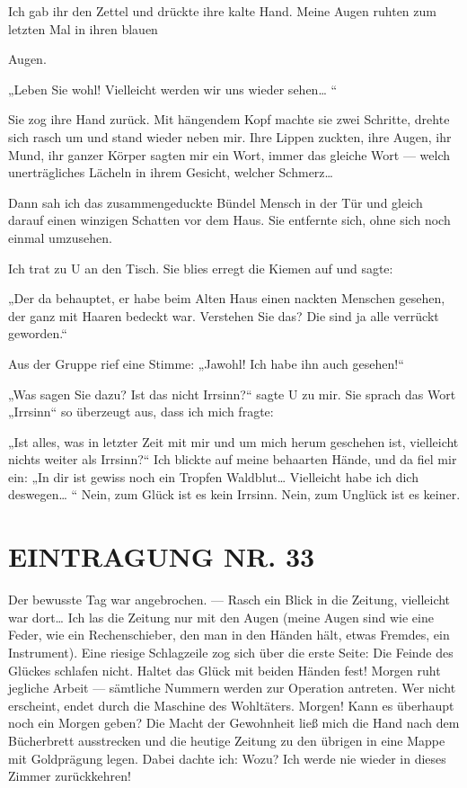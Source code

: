 Ich gab ihr den Zettel und drückte ihre kalte Hand. Meine Augen
ruhten zum letzten Mal in ihren blauen

Augen.

„Leben Sie wohl! Vielleicht werden wir uns wieder sehen\ldots{} “

Sie zog ihre Hand zurück. Mit hängendem Kopf machte sie zwei
Schritte, drehte sich rasch um und stand wieder neben mir. Ihre
Lippen zuckten, ihre Augen, ihr Mund, ihr ganzer Körper sagten mir
ein Wort, immer das gleiche Wort — welch unerträgliches Lächeln in
ihrem Gesicht, welcher Schmerz\ldots{}

Dann sah ich das zusammengeduckte Bündel Mensch in der Tür und
gleich darauf einen winzigen Schatten vor dem Haus. Sie entfernte
sich, ohne sich noch einmal umzusehen.

Ich trat zu U an den Tisch. Sie blies erregt die Kiemen auf und
sagte:

„Der da behauptet, er habe beim Alten Haus einen nackten Menschen
gesehen, der ganz mit Haaren bedeckt war. Verstehen Sie das? Die
sind ja alle verrückt geworden.“

Aus der Gruppe rief eine Stimme: „Jawohl! Ich habe ihn auch
gesehen!“

„Was sagen Sie dazu? Ist das nicht Irrsinn?“ sagte U zu mir. Sie
sprach das Wort „Irrsinn“ so überzeugt aus, dass ich mich fragte:

„Ist alles, was in letzter Zeit mit mir und um mich herum geschehen
ist, vielleicht nichts weiter als Irrsinn?“ Ich blickte auf meine
behaarten Hände, und da fiel mir ein: „In dir ist gewiss noch ein
Tropfen Waldblut\ldots{} Vielleicht habe ich dich deswegen\ldots{} “ Nein,
zum Glück ist es kein Irrsinn. Nein, zum Unglück ist es keiner.

\section{EINTRAGUNG NR. 33}

Der bewusste Tag war angebrochen. — Rasch ein Blick in die Zeitung,
vielleicht war dort\ldots{} Ich las die Zeitung nur mit den Augen (meine
Augen sind wie eine Feder, wie ein Rechenschieber, den man in den
Händen hält, etwas Fremdes, ein Instrument). Eine riesige
Schlagzeile zog sich über die erste Seite: Die Feinde des Glückes
schlafen nicht. Haltet das Glück mit beiden Händen fest! Morgen
ruht jegliche Arbeit — sämtliche Nummern werden zur Operation
antreten. Wer nicht erscheint, endet durch die Maschine des
Wohltäters. Morgen! Kann es überhaupt noch ein Morgen geben? Die
Macht der Gewohnheit ließ mich die Hand nach dem Bücherbrett
ausstrecken und die heutige Zeitung zu den übrigen in eine Mappe
mit Goldprägung legen. Dabei dachte ich: Wozu? Ich werde nie wieder
in dieses Zimmer zurückkehren!

